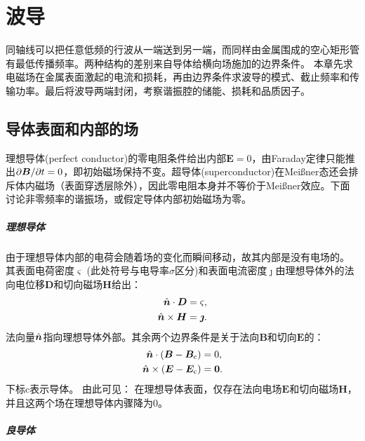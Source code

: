 \chapter{波导}
\label{chap:waveguide}
同轴线可以把任意低频的行波从一端送到另一端，而同样由金属围成的空心矩形管有最低传播频率。两种结构的差别来自导体给横向场施加的边界条件。
本章先求电磁场在金属表面激起的电流和损耗，再由边界条件求波导的模式、截止频率和传输功率。最后将波导两端封闭，考察谐振腔的储能、损耗和品质因子。

\section{导体表面和内部的场}
理想导体(perfect conductor)的零电阻条件给出内部$\bm E = 0$，由Faraday定律只能推出$\partial\bm B/\partial t = 0$，即初始磁场保持不变。超导体(superconductor)在Meißner态还会排斥体内磁场（表面穿透层除外），因此零电阻本身并不等价于Meißner效应。下面讨论非零频率的谐振场，或假定导体内部初始磁场为零。

\paragraph{理想导体}


由于理想导体内部的电荷会随着场的变化而瞬间移动，故其内部是没有电场的。
其表面电荷密度$\varsigma$ (此处符号与电导率$\sigma$区分)和表面电流密度$\bm\jmath$由理想导体外的法向电位移$\bm D$和切向磁场$\bm H$给出：
\begin{subequations}
    \begin{align}
        \mathop{}\!\hat{\bm{n}} \cdot \bm D &= \varsigma,\\
        \label{eqn:nxH=j}
        \mathop{}\!\hat{\bm{n}} \times \bm H &= \bm\jmath.
    \end{align}
\end{subequations}
法向量$\mathop{}\!\hat{\bm{n}}$指向理想导体外部。其余两个边界条件是关于法向$\bm B$和切向$\bm E$的：
\begin{subequations}
    \begin{align}
        \mathop{}\!\hat{\bm{n}} \cdot (\bm B - \bm B_\mathrm c) &= 0,\\
        \mathop{}\!\hat{\bm{n}} \times (\bm E - \bm E_\mathrm c) &= \bm 0.
    \end{align}
\end{subequations}
下标c表示导体。
由此可见：
在理想导体表面，仅存在法向电场$\bm E$和切向磁场$\bm H$，并且这两个场在理想导体内骤降为0。

\paragraph{良导体}

